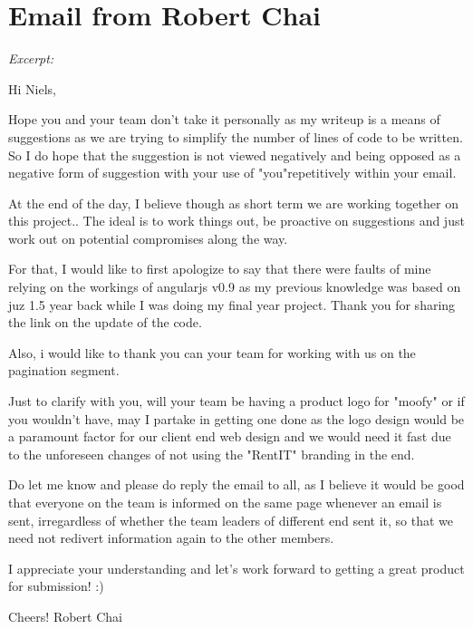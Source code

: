 \section{Email from Robert Chai}
\label{app:robertsletter}
\emph{Excerpt:}

Hi Niels,

Hope you and your team don't take it personally as my writeup is a means of
suggestions as we are trying to simplify the number of lines of code to be
written. So I do hope that the suggestion is not viewed negatively and being
opposed as a negative form of suggestion with your use of "you"repetitively
within your email.

At the end of the day, I believe though as short term we are working together
on this project.. The ideal is to work things out, be proactive on suggestions
and just work out on potential compromises along the way.

For that, I would like to first apologize to say that there were faults of mine
relying on the workings of angularjs v0.9 as my previous knowledge was based on
juz 1.5 year back while I was doing my final year project. Thank you for
sharing the link on the update of the code.

Also, i would like to thank you can your team for working with us on the
pagination segment.

Just to clarify with you, will your team be having a product logo for "moofy" or if you wouldn't have, may I partake in getting one done as the logo design would be a paramount factor for our client end web design and we would need it fast due to the unforeseen changes of not using the "RentIT" branding in the end.

Do let me know and please do reply the email to all, as I believe it would be good that everyone on the team is informed on the same page whenever an email is sent, irregardless of whether the team leaders of different end sent it, so that we need not redivert information again to the other members.

I appreciate your understanding and let's work forward to getting a great product for submission! :)

Cheers! 
Robert Chai